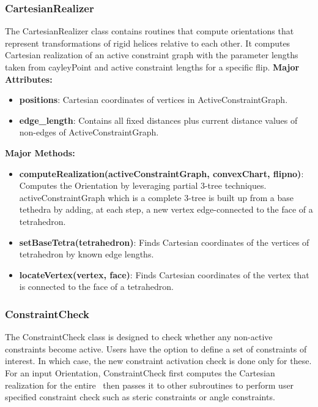 \subsubsection{CartesianRealizer} 
The CartesianRealizer class contains routines that
compute orientations that represent transformations of rigid helices
relative to each other. It computes Cartesian realization of an active 
constraint graph with the
parameter lengths taken from cayleyPoint and active constraint lengths for a
specific flip. 
\noindent \textbf{Major Attributes:} 
\begin{itemize}
		\item \textbf{positions}: Cartesian coordinates of vertices in
				ActiveConstraintGraph.
		\item \textbf{edge\_length}: Contains all fixed distances plus current
				distance values of non-edges of ActiveConstraintGraph.
\end{itemize}

\noindent \textbf{Major Methods:}
\begin{itemize}
		\item  \textbf{computeRealization(activeConstraintGraph, convexChart,
				flipno)}: Computes the Orientation by leveraging partial 3-tree
				techniques. activeConstraintGraph which is a complete 3-tree is
				built up from a base tethedra by adding, at each step, a new
				vertex edge-connected to the face of a tetrahedron.
		\item  \textbf{setBaseTetra(tetrahedron)}: Finds Cartesian
				coordinates of the vertices of tetrahedron by known edge
				lengths.
		\item  \textbf{locateVertex(vertex, face)}: Finds Cartesian
				coordinates of the vertex that is connected to the face of a
				tetrahedron.
\end{itemize}


\subsubsection{ConstraintCheck} 

The ConstraintCheck class is designed to check whether any non-active
constraints become active. Users have the option
to define a set of constraints of interest. In which case, the new constraint
activation check is done only for these. For an input Orientation,
ConstraintCheck first computes the Cartesian realization for the entire \helix\
then passes it to other subroutines to perform user specified constraint check such as
steric constraints or angle constraints.
